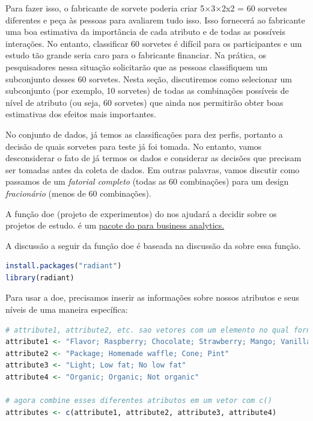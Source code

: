 \documentclass{article}
\begin{document}
Para fazer isso, o fabricante de sorvete poderia criar 5×3×2x2 = 60 sorvetes diferentes e peça às pessoas para avaliarem tudo isso. Isso fornecerá ao fabricante uma boa estimativa da importância de cada atributo e de todas as possíveis interações. No entanto, classificar 60 sorvetes é difícil para os participantes e um estudo tão grande seria caro para o fabricante financiar. Na prática, os pesquisadores nessa situação solicitarão que as pessoas classifiquem um subconjunto desses 60 sorvetes. Nesta seção, discutiremos como selecionar um subconjunto (por exemplo, 10 sorvetes) de todas as combinações possíveis de nível de atributo (ou seja, 60 sorvetes) que ainda nos permitirão obter boas estimativas dos efeitos mais importantes.

No conjunto de dados, já temos as classificações para dez perfis, portanto a decisão de quais sorvetes para teste já foi tomada. No entanto, vamos desconsiderar o fato de já termos os dados e considerar as decisões que precisam ser tomadas antes da coleta de dados. Em outras palavras, vamos discutir como passamos de um \textit{fatorial completo} (todas as 60 combinações) para um design \textit{fracionário} (menos de 60 combinações).

A função doe (projeto de experimentos) do  nos ajudará a decidir sobre os projetos de estudo.  é um \href{https://radiant-rstats.github.io/docs/index.html}{pacote do \faRProject para business analytics.}

A discussão a seguir da função doe é baseada na discussão da  sobre essa função.

\begin{lstlisting}[language=R]
install.packages("radiant")
library(radiant)
\end{lstlisting}


Para usar a doe, precisamos inserir as informações sobre nossos atributos e seus níveis de uma maneira específica:

\begin{lstlisting}[language=R]
# attribute1, attribute2, etc. sao vetores com um elemento no qual fornecemos primeiro o nome do atributo seguido por um ponto e virgula e depois fornecemos todos os niveis dos atributos separados por ponto e virgula
attribute1 <- "Flavor; Raspberry; Chocolate; Strawberry; Mango; Vanilla"
attribute2 <- "Package; Homemade waffle; Cone; Pint"
attribute3 <- "Light; Low fat; No low fat"
attribute4 <- "Organic; Organic; Not organic"

# agora combine esses diferentes atributos em um vetor com c()
attributes <- c(attribute1, attribute2, attribute3, attribute4)
\end{lstlisting}
\end{document}
